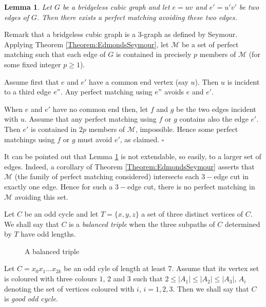 \documentclass{elsart}
\theoremstyle{plain} \theoremheaderfont{\scshape}
\newtheorem{Lem}[Thm]{\bf Lemma}
\newenvironment{Prf}{{\bf \noindent Proof } }{\hfill$\square$\\}
\begin{document}
\begin{Lem}\label{Lemma:TwoEdgesAvoiding} Let $G$ be a bridgeless
cubic graph and let $e=uv$ and $e'=u'v'$ be two edges of $G$. Then
there exists a perfect matching avoiding these two edges.
\end{Lem}
\begin{Prf}  Remark that a bridgeless cubic graph is a $3$-graph as defined by Seymour.
Applying Theorem \ref{Theorem:EdmondsSeymour}, let $\mathcal M$ be a
set of perfect matching such that each edge of $G$ is contained in
precisely $p$ members of $\mathcal M$ (for some fixed integer $p
\geq 1$).

Assume first that $e$ and $e'$ have a common end vertex (say $u$).
Then $ u$ is incident to a third edge $e"$. Any perfect matching
using $e"$ avoids $e$ and $e'$.

When $e$ and $e'$ have no common end then, let $f$ and $g$ be the
two edges incident with $u$. Assume that any perfect matching using
$f$ or $g$ contains also the edge $e'$. Then $e'$ is contained in
$2p$ members of $\mathcal M$, impossible. Hence some perfect
matchings using $f$ or $g$ must avoid $e'$, as claimed.
\end{Prf}

It can be pointed out that Lemma \ref{Lemma:TwoEdgesAvoiding} is not
extendable, so easily, to a larger set of edges. Indeed, a corollary
of Theorem \ref{Theorem:EdmondsSeymour} asserts that $\mathcal M$
(the family of perfect matching considered) intersects each $3-$edge
cut in exactly one edge. Hence for such a $3-$edge cut, there is no
perfect matching in $\mathcal M$ avoiding this set.

Let $C$ be an odd cycle and let $T=\{x,y,z\}$ a set of three
distinct vertices of $C$. We shall say that $C$ is a {\em balanced
triple} when the three subpaths of $C$ determined by $T$ have odd
lengths.

\begin{figure}[t]
\centering {} \hsize \noindent
{} \caption{A balanced triple}
\label{Figure:BalancedTriple}
\end{figure}

Let $C=x_0x_1 \ldots x_{2k}$ be an odd cyle of length at least $7$.
Assume that its vertex set is coloured with three colours $1$, $2$
and $3$ such that $2 \leq |A_1| \leq |A_2| \leq |A_3|$, $A_i$
denoting the set of vertices coloured with $i$, $i =1,2,3$. Then we
shall say that $C$ is {\em good odd cycle}.
\end{document}
